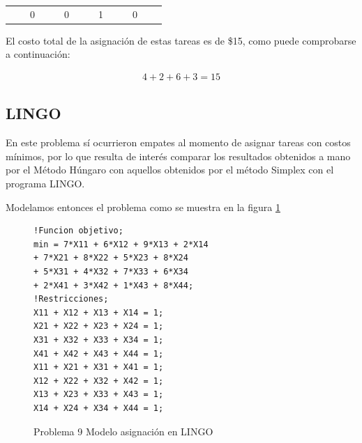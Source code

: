 \documentclass[12pt]{article}  %
\begin{document}
\begin{table}[H]
\begin{tabular}{cccccccccccccc}
\multicolumn{1}{l}{}                   &                                                                       & \cellcolor[HTML]{FD6864}0                                             &                                                                       &                                                                       & \cellcolor[HTML]{FD6864}0                                             &                                                                       &                                                                      & \cellcolor[HTML]{FD6864}1                                            &                                                                       &                                                                      & \cellcolor[HTML]{FD6864}0                                            & \multicolumn{1}{l}{}                                                  & \multicolumn{1}{l}{}     
\end{tabular}
\end{table}

El costo total de la asignación de estas tareas es de \$15, como puede comprobarse a continuación:

\begin{align}
4 + 2 + 6 + 3 = 15
\end{align}

\subsection{LINGO}
En este problema sí ocurrieron empates al momento de asignar tareas con costos mínimos, por lo que resulta de interés comparar los resultados obtenidos a mano por el Método Húngaro con aquellos obtenidos por el método Simplex con el programa LINGO.

Modelamos entonces el problema como se muestra en la figura \ref{fig:lingoProb9}

\begin{figure}[H]
	\centering
	\caption{Problema 9 Modelo asignación en LINGO}
	\label{fig:lingoProb9}
	\begin{verbatim}
!Funcion objetivo;
min = 7*X11 + 6*X12 + 9*X13 + 2*X14 
+ 7*X21 + 8*X22 + 5*X23 + 8*X24 
+ 5*X31 + 4*X32 + 7*X33 + 6*X34 
+ 2*X41 + 3*X42 + 1*X43 + 8*X44;
!Restricciones;
X11 + X12 + X13 + X14 = 1;
X21 + X22 + X23 + X24 = 1;
X31 + X32 + X33 + X34 = 1;
X41 + X42 + X43 + X44 = 1;
X11 + X21 + X31 + X41 = 1;
X12 + X22 + X32 + X42 = 1;
X13 + X23 + X33 + X43 = 1;
X14 + X24 + X34 + X44 = 1;
	\end{verbatim}
\end{figure}
\end{document}

